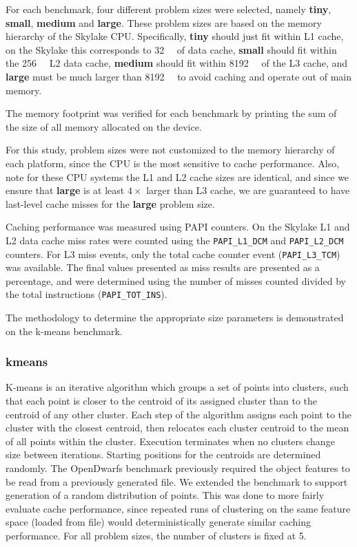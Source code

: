 \documentclass[../document.tex]{subfiles}
\begin{document}
\label{ssec:setting_sizes}

For each benchmark, four different problem sizes were selected, namely {\bf tiny}, {\bf small}, {\bf medium} and {\bf large}.
These problem sizes are based on the memory hierarchy of the Skylake CPU.
Specifically, {\bf tiny} should just fit within L1 cache, on the Skylake this corresponds to \SI{32}{\kibi\byte} of data cache, {\bf small} should fit within the \SI{256}{\kibi\byte} L2 data cache, {\bf medium} should fit within \SI{8192}{\kibi\byte} of the L3 cache, and {\bf large} must be much larger than \SI{8192}{\kibi\byte} to avoid caching and operate out of main memory.

The memory footprint was verified for each benchmark by printing the sum of the size of all memory allocated on the device.

For this study, problem sizes were not customized to the memory hierarchy of each platform, since the CPU is the most sensitive to cache performance.
Also, note for these CPU systems the L1 and L2 cache sizes are identical, and since we ensure that {\bf large} is at least $4\times$ larger than L3 cache, we are guaranteed to have last-level cache misses for the {\bf large} problem size.

Caching performance was measured using PAPI counters.
On the Skylake L1 and L2 data cache miss rates were counted using the {\tt PAPI\_L1\_DCM} and {\tt PAPI\_L2\_DCM} counters.
For L3 miss events, only the total cache counter event ({\tt PAPI\_L3\_TCM}) was available.
The final values presented as miss results are presented as a percentage, and were determined using the number of misses counted divided by the total instructions ({\tt PAPI\_TOT\_INS}).


The methodology to determine the appropriate size parameters is demonstrated on the k-means benchmark.

\subsubsection{kmeans}
K-means is an iterative algorithm which groups a set of points into clusters, such that each point is closer to the centroid of its assigned cluster than to the centroid of any other cluster.
Each step of the algorithm assigns each point to the cluster with the closest centroid, then relocates each cluster centroid to the mean of all points within the cluster.
Execution terminates when no clusters change size between iterations.
Starting positions for the centroids are determined randomly.
The OpenDwarfs benchmark previously required the object features to be read from a previously generated file.
We extended the benchmark to support generation of a random distribution of points.
This was done to more fairly evaluate cache performance, since repeated runs of clustering on the same feature space (loaded from file) would deterministically generate similar caching performance.
For all problem sizes, the number of clusters is fixed at 5.
\end{document}
